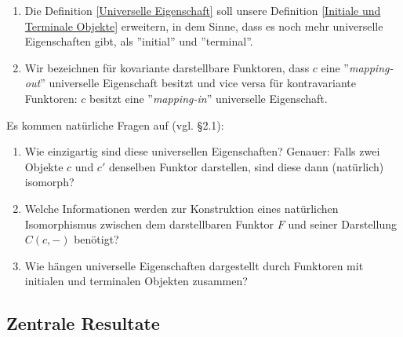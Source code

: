 \documentclass[11pt]{article}
\begin{document}
\begin{note}\mbox{}
    \begin{enumerate}[label=-]
        \item Die Definition \ref{Universelle Eigenschaft} soll unsere Definition \ref{Initiale und Terminale Objekte} erweitern, in dem Sinne, dass es noch mehr universelle Eigenschaften gibt, als ''initial'' und ''terminal''. 
        \item Wir bezeichnen für kovariante darstellbare Funktoren, dass $c$ eine ''\emph{mapping-out}'' universelle Eigenschaft besitzt und vice versa für kontravariante Funktoren: $c$ besitzt eine ''\emph{mapping-in}'' universelle Eigenschaft.
    \end{enumerate}
\end{note}

\newpage
\begin{note} \label{questions} Es kommen natürliche Fragen auf (vgl. §2.1):
\begin{enumerate}
    \item Wie einzigartig sind diese universellen Eigenschaften? Genauer: Falls zwei Objekte $c$ und $c'$ denselben Funktor darstellen, sind diese dann (natürlich) isomorph?
    \item Welche Informationen werden zur Konstruktion eines natürlichen Isomorphismus zwischen dem darstellbaren Funktor $F$ und seiner Darstellung $C(c,-)$ benötigt?
    \item Wie hängen universelle Eigenschaften dargestellt durch Funktoren mit initialen und terminalen Objekten zusammen?
\end{enumerate}
\end{note}

\subsection{Zentrale Resultate}
\end{document}
